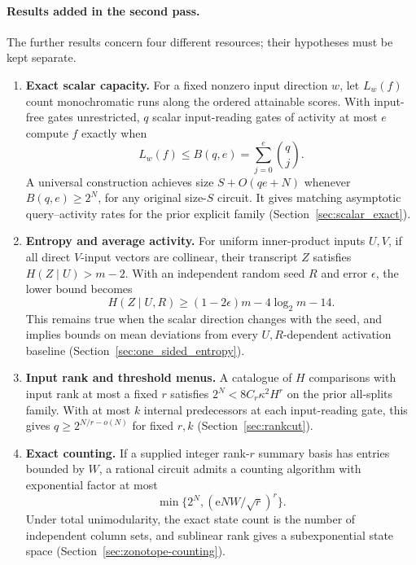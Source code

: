 \documentclass[11pt]{article}
\theoremstyle{definition}
\newcommand{\Eul}{\mathrm e}
\begin{document}
\paragraph{Results added in the second pass.}
The further results concern four different resources; their hypotheses must be kept separate.
\begin{enumerate}
 \item \textbf{Exact scalar capacity.} For a fixed nonzero input direction \(w\), let \(L_w(f)\) count monochromatic runs along the ordered attainable scores. With input-free gates unrestricted, \(q\) scalar input-reading gates of activity at most \(e\) compute \(f\) exactly when
 \[
 L_w(f)\le B(q,e)=\sum_{j=0}^{e}\binom qj.
 \]
 A universal construction achieves size \(S+O(qe+N)\) whenever \(B(q,e)\ge2^N\), for any original size-\(S\) circuit. It gives matching asymptotic query--activity rates for the prior explicit family (Section~\ref{sec:scalar_exact}).
 \item \textbf{Entropy and average activity.} For uniform inner-product inputs \(U,V\), if all direct \(V\)-input vectors are collinear, their transcript \(Z\) satisfies \(H(Z\mid U)>m-2\). With an independent random seed \(R\) and error \(\epsilon\), the lower bound becomes
 \[
 H(Z\mid U,R)\ge(1-2\epsilon)m-4\log_2m-14.
 \]
 This remains true when the scalar direction changes with the seed, and implies bounds on mean deviations from every \(U,R\)-dependent activation baseline (Section~\ref{sec:one_sided_entropy}).
 \item \textbf{Input rank and threshold menus.} A catalogue of \(H\) comparisons with input rank at most a fixed \(r\) satisfies \(2^N<8C_r\kappa^2H^r\) on the prior all-splits family. With at most \(k\) internal predecessors at each input-reading gate, this gives \(q\ge2^{N/r-o(N)}\) for fixed \(r,k\) (Section~\ref{sec:rankcut}).
 \item \textbf{Exact counting.} If a supplied integer rank-\(r\) summary basis has entries bounded by \(W\), a rational circuit admits a counting algorithm with exponential factor at most
 \[
 \min\{2^N,(\Eul NW/\sqrt r)^r\}.
 \]
 Under total unimodularity, the exact state count is the number of independent column sets, and sublinear rank gives a subexponential state space (Section~\ref{sec:zonotope-counting}).
\end{enumerate}
\end{document}
